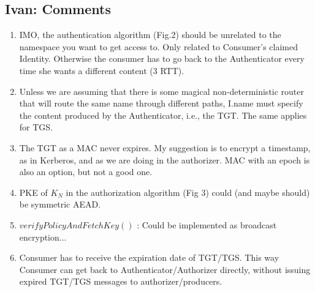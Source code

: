 \subsection{Ivan: Comments}
\begin{enumerate}
 \item IMO, the authentication algorithm (Fig.2) should be unrelated to the namespace you want to get access to. Only related to Consumer's claimed Identity. Otherwise the consumer has to go back to the Authenticator every time she wants a different content (3 RTT).
 \item Unless we are assuming that there is some magical non-deterministic router that will route the same name through different paths, I.name must specify the content produced by the Authenticator, i.e., the TGT. The same applies for TGS.
 \item The TGT as a MAC never expires. My suggestion is to encrypt a timestamp, as in Kerberos, and as we are doing in the authorizer. MAC with an epoch is also an option, but not a good one.
 \item PKE of $K_N$ in the authorization algorithm (Fig 3) could (and maybe should) be symmetric AEAD.
 \item $verifyPolicyAndFetchKey()$ : Could be implemented as broadcast encryption...
 \item Consumer has to receive the expiration date of TGT/TGS. This way Consumer can get back to Authenticator/Authorizer directly, without issuing expired TGT/TGS messages to authorizer/producers.
\end{enumerate}